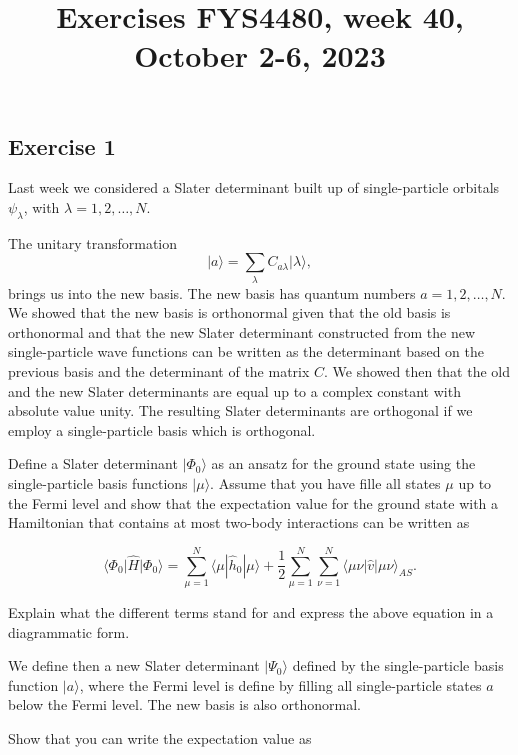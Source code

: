 \documentclass[prc]{revtex4}
\begin{document}
\title{Exercises FYS4480, week 40, October 2-6, 2023}
\maketitle



\subsection*{Exercise 1}

Last week we considered a Slater determinant built up of
single-particle orbitals $\psi_{\lambda}$, with $\lambda =
1,2,\dots,N$.

The unitary transformation
\[
\vert a\rangle  = \sum_{\lambda} C_{a\lambda}\vert \lambda\rangle,
\]
brings us into the new basis.  The new basis has quantum numbers
$a=1,2,\dots,N$.  We showed that the new basis is orthonormal given
that the old basis is orthonormal and that the new Slater determinant
constructed from the new single-particle wave functions can be written
as the determinant based on the previous basis and the determinant of
the matrix $C$.  We showed then that the old and the new Slater
determinants are equal up to a complex constant with absolute value
unity.  The resulting Slater determinants are orthogonal if we employ
a single-particle basis which is orthogonal.

Define a Slater determinant $\vert\Phi_0\rangle$ as an ansatz for the ground state
using the single-particle basis functions $\vert\mu\rangle$.  Assume
that you have fille all states $\mu$ up to the Fermi level and show
that the expectation value for the ground state with a Hamiltonian
that contains at most two-body interactions can be written as

\[
 \langle \Phi_0 \vert \hat{H}\vert \Phi_0\rangle 
  = \sum_{\mu=1}^N \langle \mu | \hat{h}_0 | \mu \rangle +
  \frac{1}{2}\sum_{{\mu}=1}^N\sum_{{\nu}=1}^N \langle \mu\nu|\hat{v}|\mu\nu\rangle_{AS}.
\]

Explain what the different terms stand for and express the above
equation in a diagrammatic form.

We define then a new Slater determinant $\vert\Psi_0\rangle$ defined by the
single-particle basis function $\vert a\rangle$, where the Fermi level is
define by filling all single-particle states $a$ below the Fermi level. The new basis is also orthonormal.

Show that you can write the expectation value as
\end{document}
